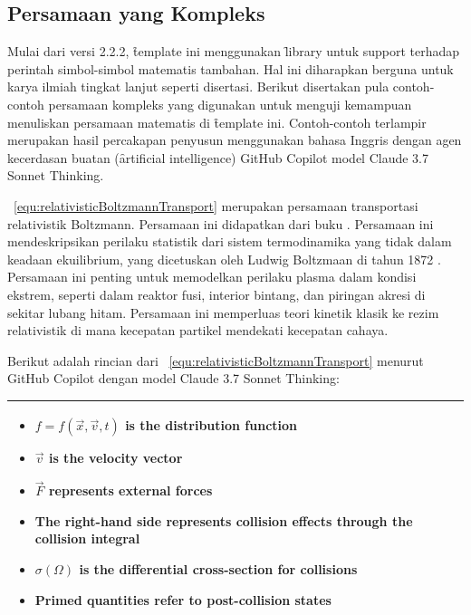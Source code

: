 \subsection{Persamaan yang Kompleks}
\label{sec:complexEqu}
Mulai dari versi 2.2.2, \f{template} ini menggunakan \f{library}  untuk support terhadap perintah simbol-simbol matematis tambahan. Hal ini diharapkan berguna untuk karya ilmiah tingkat lanjut seperti disertasi. Berikut disertakan pula contoh-contoh persamaan kompleks yang digunakan untuk menguji kemampuan menuliskan persamaan matematis di \f{template} ini. Contoh-contoh terlampir merupakan hasil percakapan penyusun menggunakan bahasa Inggris dengan agen kecerdasan buatan (\f{artificial intelligence}) GitHub Copilot model Claude 3.7 Sonnet Thinking.

\equ~\ref{equ:relativisticBoltzmannTransport} merupakan persamaan transportasi relativistik Boltzmann. Persamaan ini didapatkan dari buku \cite{book:cercignani2002boltzmann}. Persamaan ini mendeskripsikan perilaku statistik dari sistem termodinamika yang tidak dalam keadaan ekuilibrium, yang dicetuskan oleh Ludwig Boltzmaan di tahun 1872 \citep{book:encyclopediaOfPhysics}. Persamaan ini penting untuk memodelkan perilaku plasma dalam kondisi ekstrem, seperti dalam reaktor fusi, interior bintang, dan piringan akresi di sekitar lubang hitam. Persamaan ini memperluas teori kinetik klasik ke rezim relativistik di mana kecepatan partikel mendekati kecepatan cahaya.



Berikut adalah rincian dari \equ~\ref{equ:relativisticBoltzmannTransport} menurut GitHub Copilot dengan model Claude 3.7 Sonnet Thinking:

\begin{tabular}{| p{14cm} |}
	\hline\begin{itemize}
		\item $f = f(\vec{x},\vec{v},t)$ is the distribution function
		\item $\vec{v}$ is the velocity vector
		\item $\vec{F}$ represents external forces
		\item The right-hand side represents collision effects through the collision integral
		\item $\sigma(\Omega)$ is the differential cross-section for collisions
		\item Primed quantities refer to post-collision states
	\end{itemize} \\
	\hline
\end{tabular}

